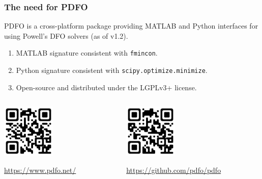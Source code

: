 \documentclass{polyu-presentation}
\begin{document}
\begin{frame}
    \frametitle{The need for PDFO}

    \begin{block}{}
        \alert{PDFO} is a \alert{cross-platform} package providing \alert{MATLAB and Python} interfaces for using Powell's DFO solvers (as of v1.2).
    \end{block}

    \medskip

    \begin{enumerate}
        \item \alert{MATLAB} signature consistent with \texttt{fmincon}.
        \item \alert{Python} signature consistent with \texttt{scipy.optimize.minimize}.
        \item \alert{Open-source} and distributed under the LGPLv3+ license.
    \end{enumerate}

    \medskip
    
    \begin{columns}
        \begin{column}{0.5\textwidth}
            \begin{center}
                \includegraphics[width=1in]{images/qr-codes/pdfo.png}

                \footnotesize\url{https://www.pdfo.net/}
            \end{center}
        \end{column}
        \begin{column}{0.5\textwidth}
            \begin{center}
                \includegraphics[width=1in]{images/qr-codes/pdfo-github.png}

                \footnotesize\url{https://github.com/pdfo/pdfo}
            \end{center}
        \end{column}
    \end{columns}
\end{frame}
\end{document}
